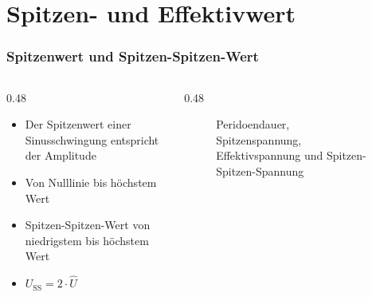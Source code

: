 
\section{Spitzen- und Effektivwert}
\label{section:spitze_effektiv_wert}
\begin{frame}%
\frametitle{Spitzenwert und Spitzen-Spitzen-Wert}
\begin{columns}
    \begin{column}{0.48\textwidth}
        \begin{itemize}
            \item Der Spitzenwert einer Sinusschwingung entspricht der Amplitude
            \item Von Nulllinie bis höchstem Wert
            \item Spitzen-Spitzen-Wert von niedrigstem bis höchstem Wert
            \item $U_\text{SS} = 2\cdot \hat{U}$
        \end{itemize}
    \end{column}
    \begin{column}{0.48\textwidth}
        \begin{figure}
            \caption{\scriptsize Peridoendauer, Spitzenspannung, Effektivspannung und Spitzen-Spitzen-Spannung}
            \label{e_spitze_effektiv_wert_bezeichnungen_sinus}
        \end{figure}
    \end{column}
\end{columns}
\end{frame}

\begin{frame}
\end{frame}

